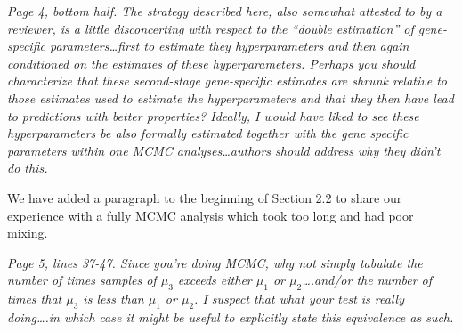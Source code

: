 \documentclass{article}
\newcommand{\comment}[1]{\textit{#1}}
\newcommand{\response}[1]{#1}
\begin{document}
\comment{Page 4, bottom half.  The strategy described here, also somewhat attested to by a reviewer, is a little disconcerting with respect to the “double estimation” of gene-specific parameters…first to estimate they hyperparameters and then again conditioned on the estimates of these hyperparameters.  Perhaps you should characterize that these second-stage gene-specific estimates are shrunk relative to those estimates used to estimate the hyperparameters and that they then have lead to predictions with better properties?  Ideally, I would have liked to see these hyperparameters be also formally estimated together with the gene specific parameters within one MCMC analyses…authors should address why they didn’t do this.}

\response{We have added a paragraph to the beginning of Section 2.2 to share our experience with a fully MCMC analysis which took too long and had poor mixing.}

\comment{Page 5, lines 37-47.  Since you’re doing MCMC, why not simply tabulate the number of times samples of $\mu_3$ exceeds either $\mu_1$ or $\mu_2$….and/or the number of times that $\mu_3$ is less than $\mu_1$ or $\mu_2$.  I suspect that what your test is really doing….in which case it might be useful to explicitly state this equivalence as such.}
\end{document}
